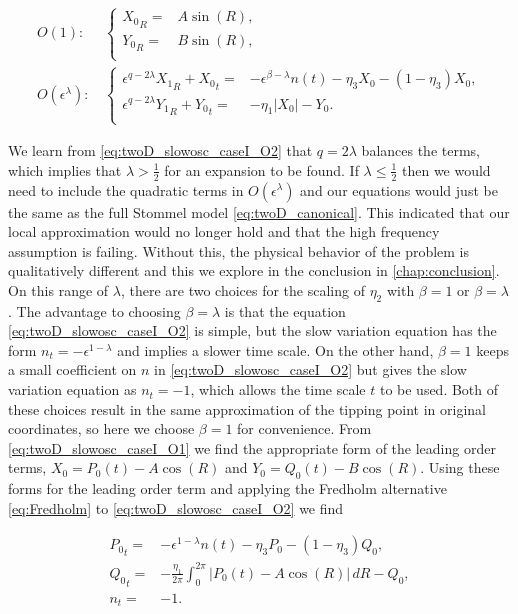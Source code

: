 \begin{align} \label{eq:twoD_slowosc_caseI_O1}
O(1):\, &\begin{cases}
	{X_0}_R =&  A\sin(R), \\
	{Y_0}_R =&  B\sin(R),\\
\end{cases}\\ \label{eq:twoD_slowosc_caseI_O2}
O(\epsilon^\lambda): \, & \begin{cases}
	\epsilon^{q-2\lambda}{X_1}_R+{X_0}_t =&  -\epsilon^{\beta-\lambda} n(t) -\eta_3 X_0-(1-\eta_3)X_0, \\
	\epsilon^{q-2\lambda}{Y_1}_R+{Y_0}_t =&  -\eta_1|X_0|-Y_0.\\
\end{cases}
\end{align}

We learn from \eqref{eq:twoD_slowosc_caseI_O2} that $q= 2\lambda$ balances the terms, which implies that $\lambda> \frac{1}{2}$ for an expansion to be found. If $\lambda\le \frac{1}{2}$ then we would need to include the quadratic terms in $O(\epsilon^\lambda)$ and our equations would just be the same as the full Stommel model \eqref{eq:twoD_canonical}. This indicated that our local approximation would no longer hold and that the high frequency assumption is failing. Without this, the physical behavior of the problem is qualitatively different and this we explore in the conclusion in \autoref{chap:conclusion}. On this range of $\lambda$, there are two choices for the scaling of $\eta_2$ with $\beta=1$ or $\beta=\lambda$. The advantage to choosing $\beta=\lambda$ is that the equation \eqref{eq:twoD_slowosc_caseI_O2} is simple, but the slow variation equation has the form $n_t = -\epsilon^{1-\lambda}$ and implies a slower time scale. On the other hand, $\beta=1$ keeps a small coefficient on $n$ in \eqref{eq:twoD_slowosc_caseI_O2} but gives the slow variation equation as $n_t=-1$, which allows the time scale $t$ to be used. Both of these choices result in the same approximation of the tipping point in original coordinates, so here we choose $\beta=1$ for convenience. From \eqref{eq:twoD_slowosc_caseI_O1} we find the appropriate form of the leading order terms, $X_0=P_0(t)-A\cos(R)$ and $Y_0=Q_0(t)-B\cos(R)$. Using these forms for the leading order term and applying the Fredholm alternative \eqref{eq:Fredholm} to \eqref{eq:twoD_slowosc_caseI_O2} we find 

\begin{equation}\label{eq:twoD_slowosc_caseI_fullinner}
\begin{aligned}
{P_0}_t =&  -\epsilon^{1-\lambda} n(t) -\eta_3 P_0-(1-\eta_3)Q_0, \\
{Q_0}_t =&  -\frac{\eta_1}{2\pi}\int_0^{2\pi}|P_0(t)-A\cos(R)|\,dR-Q_0,\\
n_t =& -1.
\end{aligned}
\end{equation}

